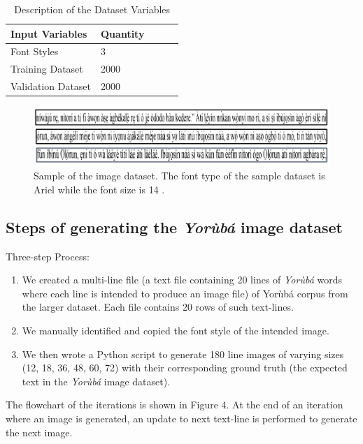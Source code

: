 \documentclass[review]{elsarticle}
\newcommand{\yor}{\textit{Yor\`ub\'a }}
\begin{document}
\begin{table}[h]
	\centering
	{\caption{Description of the Dataset Variables}\label{utterance structure} \smallskip}
	\begin{tabular}{l p{2.5cm} p{2.0cm} p{2.0cm} r}\toprule[0.01cm]
		Input Variables & Quantity  \bigstrut \\[2ex] \toprule[0.01cm]
		Font Styles & 3 \bigstrut \\[2ex]
		Training Dataset & 2000 \bigstrut \\[2ex]
		Validation Dataset  & 2000\bigstrut \\[2ex]
		\hline
	\end{tabular}
\end{table}

\begin{figure}[h]
\centering
\includegraphics[width=1.1\linewidth]{datasample2}
\caption{Sample of the image dataset. The font type of the sample dataset is Ariel while the font size is 14 .}
\label{fig:datasample2}
\end{figure}


\subsection{Steps of generating the \yor image dataset}
\hspace{3ex} Three-step Process:
\begin{enumerate}[i]
\item We created a multi-line file (a text file containing 20 lines of \yor words where each line is intended to produce an image file) of Yor\`{u}b\'{a} corpus from the larger dataset. Each file contains 20 rows of such text-lines.
\item We manually identified and copied the font style of the intended image.
\item We then wrote a Python script to generate 180 line images of varying sizes (12, 18, 36, 48, 60, 72) with their corresponding ground truth (the expected text in the \yor image dataset).
\end{enumerate}
The flowchart of the iterations is shown in Figure 4. At the end of an iteration where an image is generated, an update to next text-line is performed to generate the next image.
\end{document}
